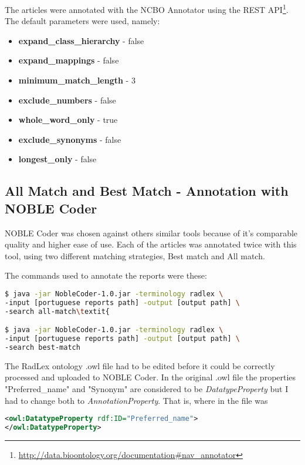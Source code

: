 The articles were annotated with the NCBO Annotator using the REST API\footnote{\url{http://data.bioontology.org/documentation\#nav_annotator}}. The default parameters were used, namely:

\begin{itemize}
\setlength{\itemsep}{1pt}
\setlength{\parskip}{0pt}
\setlength{\parsep}{0pt}
\item \textbf{expand\_class\_hierarchy} - false
\item \textbf{expand\_mappings}        - false
\item \textbf{minimum\_match\_length}   - 3
\item \textbf{exclude\_numbers}        - false
\item \textbf{whole\_word\_only}        - true
\item \textbf{exclude\_synonyms}       - false
\item \textbf{longest\_only}			  - false
\end{itemize} 

\subsection{All Match and Best Match - Annotation with NOBLE Coder}

NOBLE Coder was chosen against others similar tools because of it's comparable quality and higher ease of use. Each of the articles was annotated twice with this tool, using two different matching strategies, Best match and All match.

The commands used to annotate the reports were these:


\begin{lstlisting}[language=bash]
$ java -jar NobleCoder-1.0.jar -terminology radlex \
-input [portuguese reports path] -output [output path] \
-search all-match\textit{

$ java -jar NobleCoder-1.0.jar -terminology radlex \
-input [portuguese reports path] -output [output path] \
-search best-match
\end{lstlisting}


The RadLex ontology .owl file had to be edited before it could be correctly processed and uploaded to NOBLE Coder. In the original .owl file the properties  "Preferred\_name" and "Synonym" are considered to be \textit{DatatypeProperty} but I had to change both to \textit{AnnotationProperty}. That is, where in the file was


\begin{lstlisting}[language=xml]
<owl:DatatypeProperty rdf:ID="Preferred_name">
</owl:DatatypeProperty>
\end{lstlisting}


